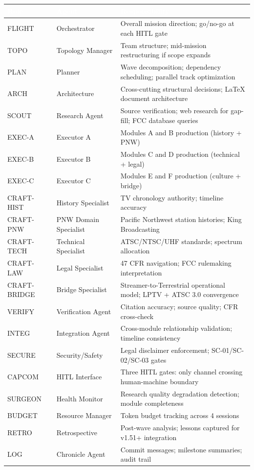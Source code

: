\documentclass[11pt,letterpaper]{article}
\newcommand{\tableheader}[1]{\textbf{\sffamily\textcolor{white}{#1}}}
\begin{document}
\begin{center}
\begin{tabularx}{\textwidth}{L{2cm}L{3cm}X}
\toprule
{}
\tableheader{Role} & \tableheader{Agent} & \tableheader{Responsibility} \\
\midrule
FLIGHT & Orchestrator & Overall mission direction; go/no-go at each HITL gate \\
TOPO & Topology Manager & Team structure; mid-mission restructuring if scope expands \\
PLAN & Planner & Wave decomposition; dependency scheduling; parallel track optimization \\
ARCH & Architecture & Cross-cutting structural decisions; LaTeX document architecture \\
SCOUT & Research Agent & Source verification; web research for gap-fill; FCC database queries \\
EXEC-A & Executor A & Modules A and B production (history + PNW) \\
EXEC-B & Executor B & Modules C and D production (technical + legal) \\
EXEC-C & Executor C & Modules E and F production (culture + bridge) \\
CRAFT-HIST & History Specialist & TV chronology authority; timeline accuracy \\
CRAFT-PNW & PNW Domain Specialist & Pacific Northwest station histories; King Broadcasting \\
CRAFT-TECH & Technical Specialist & ATSC/NTSC/UHF standards; spectrum allocation \\
CRAFT-LAW & Legal Specialist & 47 CFR navigation; FCC rulemaking interpretation \\
CRAFT-BRIDGE & Bridge Specialist & Streamer-to-Terrestrial operational model; LPTV + ATSC 3.0 convergence \\
VERIFY & Verification Agent & Citation accuracy; source quality; CFR cross-check \\
INTEG & Integration Agent & Cross-module relationship validation; timeline consistency \\
SECURE & Security/Safety & Legal disclaimer enforcement; SC-01/SC-02/SC-03 gates \\
CAPCOM & HITL Interface & Three HITL gates: only channel crossing human-machine boundary \\
SURGEON & Health Monitor & Research quality degradation detection; module completeness \\
BUDGET & Resource Manager & Token budget tracking across 4 sessions \\
RETRO & Retrospective & Post-wave analysis; lessons captured for v1.51+ integration \\
LOG & Chronicle Agent & Commit messages; milestone summaries; audit trail \\
\bottomrule
\end{tabularx}
\end{center}
\end{document}
